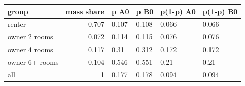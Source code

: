 \begingroup\small
\setlength{\tabcolsep}{3pt}
\renewcommand{\arraystretch}{1.04}
\begin{tabularx}{\linewidth}{XrXXXX}
\toprule
group & mass share & p A0 & p B0 & p(1-p) A0 & p(1-p) B0 \\
\midrule
renter & 0.707 & 0.107 & 0.108 & 0.066 & 0.066 \\
owner 2 rooms & 0.072 & 0.114 & 0.115 & 0.076 & 0.076 \\
owner 4 rooms & 0.117 & 0.31 & 0.312 & 0.172 & 0.172 \\
owner 6+ rooms & 0.104 & 0.546 & 0.551 & 0.21 & 0.21 \\
all & 1 & 0.177 & 0.178 & 0.094 & 0.094 \\
\bottomrule
\end{tabularx}
\endgroup
